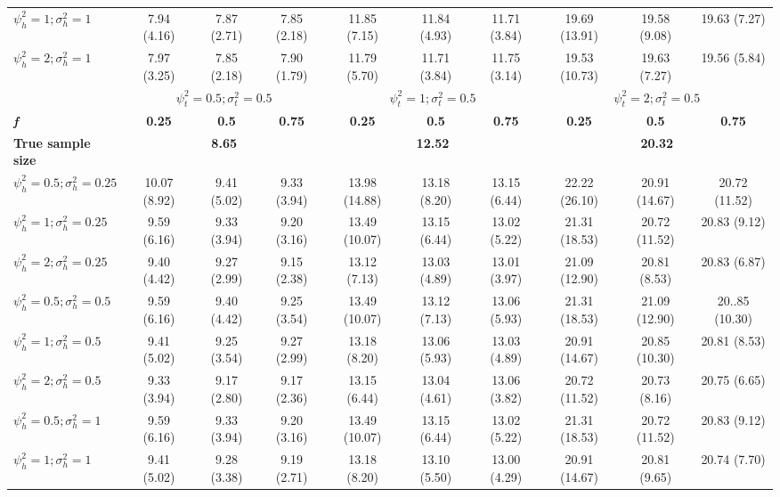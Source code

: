 \begin{table}[ht]
{\begin{tabular}{l c c c c c c c c c}
$\psi_h^2 = 1; \sigma_h^2 = 1$ & 7.94 (4.16) & 7.87 (2.71) & 7.85 (2.18) & 11.85 (7.15) & 11.84 (4.93) & 11.71 (3.84) & 19.69 (13.91) & 19.58 (9.08) & 19.63 (7.27) \\
$\psi_h^2 = 2; \sigma_h^2 = 1$ & 7.97 (3.25) & 7.85 (2.18) & 7.90 (1.79) & 11.79 (5.70) & 11.71 (3.84) & 11.75 (3.14) & 19.53 (10.73) & 19.63 (7.27) & 19.56 (5.84) \\
\hline 
 & \multicolumn{3}{c}{$\psi_t^2 = 0.5; \sigma_t^2 = 0.5$} & \multicolumn{3}{c}{$\psi_t^2 = 1; \sigma_t^2 = 0.5$} & \multicolumn{3}{c}{$\psi_t^2= 2; \sigma_t^2 = 0.5$} \\
\addlinespace[1pt]
\cmidrule(lr){2-4} \cmidrule(lr){5-7} \cmidrule(lr){8-10}
\textbf{\textit{f}} & \textbf{0.25} & \textbf{0.5} & \textbf{0.75} & \textbf{0.25} & \textbf{0.5} & \textbf{0.75} & \textbf{0.25} & \textbf{0.5} & \textbf{0.75} \\
\hline
\textbf{True sample size} & \multicolumn{3}{c}{\textbf{8.65}} & \multicolumn{3}{c}{\textbf{12.52}} & \multicolumn{3}{c}{\textbf{20.32}} \\
$\psi_h^2 = 0.5; \sigma_h^2 = 0.25$ & 10.07 (8.92) & 9.41 (5.02) & 9.33 (3.94) & 13.98 (14.88) & 13.18 (8.20) & 13.15 (6.44) & 22.22 (26.10) & 20.91 (14.67) & 20.72 (11.52) \\
$\psi_h^2 = 1; \sigma_h^2 = 0.25$ & 9.59 (6.16) & 9.33 (3.94) & 9.20 (3.16) & 13.49 (10.07) & 13.15 (6.44) & 13.02 (5.22) & 21.31 (18.53) & 20.72 (11.52) & 20.83 (9.12) \\
$\psi_h^2 = 2; \sigma_h^2 = 0.25$ & 9.40 (4.42) & 9.27 (2.99) & 9.15 (2.38) & 13.12 (7.13) & 13.03 (4.89) & 13.01 (3.97) & 21.09 (12.90) & 20.81 (8.53) & 20.83 (6.87) \\
$\psi_h^2 = 0.5; \sigma_h^2 = 0.5$ & 9.59 (6.16) & 9.40 (4.42) & 9.25 (3.54) & 13.49 (10.07) & 13.12 (7.13) & 13.06 (5.93) & 21.31 (18.53) & 21.09 (12.90) & 20..85 (10.30) \\
$\psi_h^2 = 1; \sigma_h^2 = 0.5$ & 9.41 (5.02) & 9.25 (3.54) & 9.27 (2.99) & 13.18 (8.20) & 13.06 (5.93) & 13.03 (4.89) & 20.91 (14.67) & 20.85 (10.30) & 20.81 (8.53) \\
$\psi_h^2 = 2; \sigma_h^2 = 0.5$ & 9.33 (3.94) & 9.17 (2.80) & 9.17 (2.36) & 13.15 (6.44) & 13.04 (4.61) & 13.06 (3.82) & 20.72 (11.52) & 20.73 (8.16) & 20.75 (6.65) \\
$\psi_h^2 = 0.5; \sigma_h^2 = 1$ & 9.59 (6.16) & 9.33 (3.94) & 9.20 (3.16) & 13.49 (10.07) & 13.15 (6.44) & 13.02 (5.22) & 21.31 (18.53) &  20.72 (11.52) & 20.83 (9.12) \\
$\psi_h^2 = 1; \sigma_h^2 = 1$ & 9.41 (5.02) & 9.28 (3.38) & 9.19 (2.71) & 13.18 (8.20) & 13.10 (5.50) & 13.00 (4.29) & 20.91 (14.67) & 20.81 (9.65) & 20.74 (7.70) \\

\end{tabular}}
\end{table}
